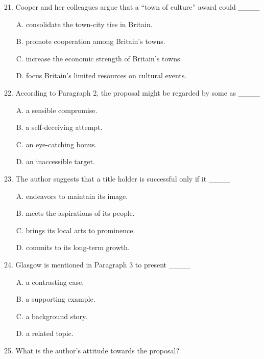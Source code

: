 \documentclass[UTF8,11pt]{ctexart}
\begin{document}
21. Cooper and her colleagues argue that a “town of culture” award could \_\_\_\_


\begin{itemize}[leftmargin=2em,itemsep=.2em,topsep=.4em]\item[A.] consolidate the town-city ties in Britain.
\item[B.] promote cooperation among Britain’s towns.
\item[C.] increase the economic strength of Britain’s towns.
\item[D.] focus Britain’s limited resources on cultural events.
\end{itemize}

22. According to Paragraph 2, the proposal might be regarded by some as \_\_\_\_


\begin{itemize}[leftmargin=2em,itemsep=.2em,topsep=.4em]\item[A.] a sensible compromise.
\item[B.] a self-deceiving attempt.
\item[C.] an eye-catching bonus.
\item[D.] an inaccessible target.
\end{itemize}

23. The author suggests that a title holder is successful only if it \_\_\_\_


\begin{itemize}[leftmargin=2em,itemsep=.2em,topsep=.4em]\item[A.] endeavors to maintain its image.
\item[B.] meets the aspirations of its people.
\item[C.] brings its local arts to prominence.
\item[D.] commits to its long-term growth.
\end{itemize}

24. Glasgow is mentioned in Paragraph 3 to present \_\_\_\_


\begin{itemize}[leftmargin=2em,itemsep=.2em,topsep=.4em]\item[A.] a contrasting case.
\item[B.] a supporting example.
\item[C.] a background story.
\item[D.] a related topic.
\end{itemize}

25. What is the author’s attitude towards the proposal?
\end{document}
